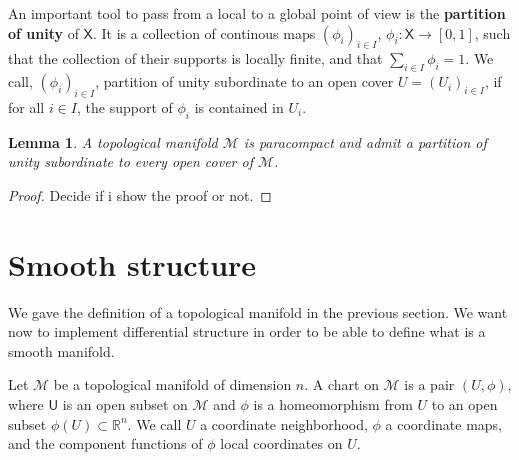\documentclass[10pt]{book}
\newcommand{\Mcal}{\mathcal{M}}
\newcommand{\Rbb}{\mathbb{R}}
\newcommand{\Usf}{\mathsf{U}}
\newcommand{\Xsf}{\mathsf{X}}
\theoremstyle{break}
\newtheorem{lemma}{Lemma}
\newtheorem{proof}{Proof}
\begin{document}
\bigskip


An important tool to pass from a local to a global point of view is the \textbf{partition of unity} of $\Xsf$. It is a collection of continous maps $(\phi_i)_{i \in I}$, $\phi_i : \Xsf \to [0,1]$, such that the collection of their supports is locally finite, and that $\sum_{i\in I} \phi_i = 1$. We call, $(\phi_i)_{i \in I}$, partition of unity subordinate to an open cover $U=(U_i)_{i \in I}$, if for all $i \in I$, the support of $\phi_i$ is contained in $U_i$.


\begin{lemma}
A topological manifold $\Mcal$ is paracompact and admit a partition of unity subordinate to every open cover of $\Mcal$.
\end{lemma}


\begin{proof}
Decide if i show the proof or not.
\end{proof}


\section{Smooth structure}

We gave the definition of a topological manifold in the previous section. We want now to implement differential structure in order to be able to define what is a smooth manifold.

\bigskip

Let $\Mcal$ be a topological manifold of dimension $n$. A chart on $\Mcal$ is a pair $(U,\phi)$, where $\Usf$ is an open subset on $\Mcal$ and $\phi$ is a homeomorphism from $U$ to an open subset $\phi(U) \subset \Rbb^n$. We call $U$ a coordinate neighborhood, $\phi$ a coordinate maps, and the component functions of $\phi$ local coordinates on $U$.
\end{document}
